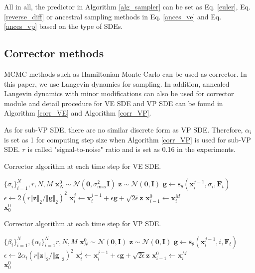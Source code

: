 All in all, the predictor in Algorithm \ref{alg_sampler} can be set as Eq. \ref{euler}, Eq. \ref{reverse_diff} or ancestral sampling methods in Eq. \ref{ances_ve} and Eq. \ref{ances_vp} based on the type of SDEs.

\subsection{Corrector methods}
MCMC methods such as Hamiltonian Monte Carlo can be used as corrector. In this paper, we use Langevin dynamics for sampling. In addition, annealed Langevin dynamics with minor modifications can also be used for corrector module and detail procedure for VE SDE and VP SDE can be found in Algorithm \ref{corr_VE} and Algorithm \ref{corr_VP}. 

As for sub-VP SDE, there are no similar discrete form as VP SDE. Therefore, $\alpha_i$ is set as 1 for computing step size when Algorithm \ref{corr_VP} is used for sub-VP SDE. $r$ is called "signal-to-noise" ratio and is set as 0.16 in the experiments.

\begin{algorithm}
	\caption{Corrector algorithm at each time step for VE SDE.}
	\label{corr_VE}
	\begin{algorithmic}
		\Require $\{\sigma_i\}_{i=1}^N, r,N, M$
		\State $\textbf{x}_N^{0}\sim \mathcal{N}(\textbf{0}, \sigma_{\text{max}}^2\textbf{I})$
		\State $\textbf{z}\sim \mathcal{N}(\textbf{0}, \textbf{I})$
		\State $\textbf{g}\leftarrow \textbf{s}_{\theta}(\textbf{x}_i^{j-1}, \sigma_i, \textbf{F}_t)$
		\State $\epsilon\leftarrow 2(r\Vert\textbf{z}\Vert_2/\Vert \textbf{g}\Vert_2)^2$
		\State $\textbf{x}_{i}^j\leftarrow \textbf{x}_i^{j-1} + \epsilon \textbf{g} + \sqrt{2\epsilon}\textbf{z}$
		\EndFor
		\State $\textbf{x}_{i-1}^0\leftarrow\textbf{x}_i^M$
		\EndFor\\
		\Return $\textbf{x}_0^0$
	\end{algorithmic}
\end{algorithm}

\begin{algorithm}
	\caption{Corrector algorithm at each time step for VP SDE.}
	\label{corr_VP}
	\begin{algorithmic}
		\Require $\{\beta_i\}_{i=1}^N, \{\alpha_i\}_{i=1}^N r,N, M$
		\State $\textbf{x}_N^{0}\sim \mathcal{N}(\textbf{0}, \textbf{I})$
		\For{$i\leftarrow\text{N}$ to 1}
		\For{$j\leftarrow$ 1 to $M$}
		\State $\textbf{z}\sim \mathcal{N}(\textbf{0}, \textbf{I})$
		\State $\textbf{g}\leftarrow \textbf{s}_{\theta}(\textbf{x}_i^{j-1}, i, \textbf{F}_t)$
		\State $\epsilon\leftarrow 2\alpha_i(r\Vert\textbf{z}\Vert_2/\Vert \textbf{g}\Vert_2)^2$
		\State $\textbf{x}_{i}^j\leftarrow \textbf{x}_i^{j-1} + \epsilon \textbf{g} + \sqrt{2\epsilon}\textbf{z}$
		\EndFor
		\State $\textbf{x}_{i-1}^0\leftarrow\textbf{x}_i^M$
		\EndFor\\
		\Return $\textbf{x}_0^0$
	\end{algorithmic}
\end{algorithm}

